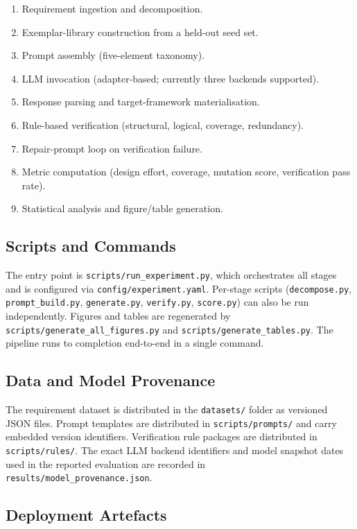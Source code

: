 \documentclass[conference]{IEEEtran}
\begin{document}
\begin{enumerate}
\item Requirement ingestion and decomposition.
\item Exemplar-library construction from a held-out seed set.
\item Prompt assembly (five-element taxonomy).
\item LLM invocation (adapter-based; currently three backends supported).
\item Response parsing and target-framework materialisation.
\item Rule-based verification (structural, logical, coverage, redundancy).
\item Repair-prompt loop on verification failure.
\item Metric computation (design effort, coverage, mutation score, verification pass rate).
\item Statistical analysis and figure/table generation.
\end{enumerate}

\subsection{Scripts and Commands}

The entry point is \texttt{scripts/run\_experiment.py}, which orchestrates all stages and is configured via \texttt{config/experiment.yaml}. Per-stage scripts (\texttt{decompose.py}, \texttt{prompt\_build.py}, \texttt{generate.py}, \texttt{verify.py}, \texttt{score.py}) can also be run independently. Figures and tables are regenerated by \texttt{scripts/generate\_all\_figures.py} and \texttt{scripts/generate\_tables.py}. The pipeline runs to completion end-to-end in a single command.

\subsection{Data and Model Provenance}

The requirement dataset is distributed in the \texttt{datasets/} folder as versioned JSON files. Prompt templates are distributed in \texttt{scripts/prompts/} and carry embedded version identifiers. Verification rule packages are distributed in \texttt{scripts/rules/}. The exact LLM backend identifiers and model snapshot dates used in the reported evaluation are recorded in \texttt{results/model\_provenance.json}.

\subsection{Deployment Artefacts}
\end{document}

